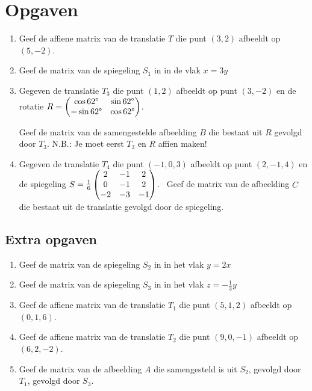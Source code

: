 \section{Opgaven}
\begin{enumerate}
    \setlength{\itemsep}{10pt}
	\item Geef de affiene matrix van de translatie $T$  die punt $(3,2)$ afbeeldt op $(5,-2)$.
	
	\item Geef de matrix van de spiegeling  $S_1$ in \RD in de vlak $x=3y$ 
	
	\item Gegeven de translatie $T_{3}$ die punt $(1,2)$ afbeeldt op punt $(3,-2)$ en de rotatie 
    	$R = \begin{pmatrix} \cos 62\degree & \sin 62\degree \\ -\sin 62\degree & \cos 62\degree \end{pmatrix} $. 
 
	Geef de matrix van de samengestelde afbeelding $B$ die bestaat uit $R$ gevolgd door $T_{3}$. N.B.: Je moet eerst $T_{3}$ en $R$ affien maken!
	
	\item Gegeven de translatie $T_{4}$ die punt $(-1,0,3)$ afbeeldt op punt $(2,-1,4)$ en de spiegeling 
	$S = \frac{1}{6} \begin{pmatrix} 2&-1&2 \\ 0&-1&2 \\ -2&-3&-1 \end{pmatrix} $.  \ 
	Geef de matrix van de afbeelding $C$ die bestaat uit de translatie gevolgd door de spiegeling.
\end{enumerate} 
\vspace{2cm}

\subsection{Extra opgaven}
\begin{enumerate}
    \setlength{\itemsep}{10pt}
	\item Geef de matrix van de spiegeling $S_2$ in \RD in het vlak $y=2x$ 
	
	\item Geef de matrix van de spiegeling $S_3$ in \RD in het vlak $z= -\frac{1}{3}y$ 
	
	\item Geef de affiene matrix van de translatie $T_{1}$ die punt $(5,1,2)$ afbeeldt op $(0,1,6)$.
	
	\item Geef de affiene matrix van de translatie $T_{2}$ die punt $(9,0,-1)$ afbeeldt op $(6,2,-2)$.
	
	\item Geef de matrix van de afbeelding $A$ die samengesteld is uit $S_2$, gevolgd door $T_1$, gevolgd door $S_3$.  
\end{enumerate}

